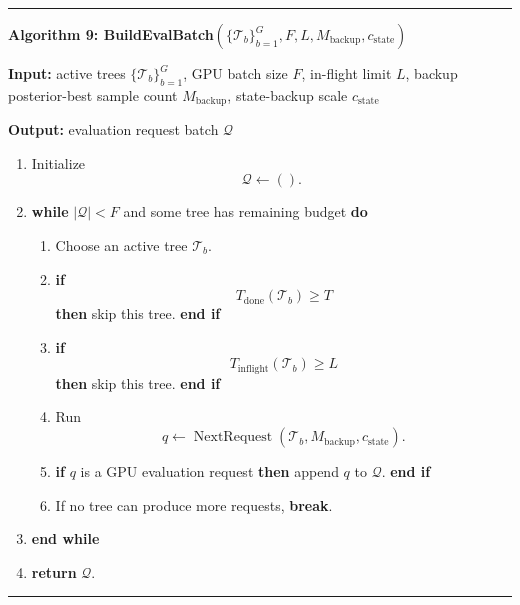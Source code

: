 \documentclass[11pt]{article}
\newcommand{\Tree}{\mathcal{T}}
\newcommand{\NextRequest}{\operatorname{NextRequest}}
\newenvironment{algorithmblock}[1]
{
  \par\medskip
  \noindent\hrule\par\smallskip
  \noindent\textbf{#1}
  \par\smallskip
}
{
  \par\smallskip\noindent\hrule\par\medskip
}
\newcommand{\Input}{\textbf{Input: }}
\newcommand{\Output}{\textbf{Output: }}
\newcommand{\Return}{\textbf{return }}
\newcommand{\If}{\textbf{if }}
\newcommand{\Then}{\textbf{ then }}
\newcommand{\EndIf}{\textbf{end if}}
\newcommand{\While}{\textbf{while }}
\newcommand{\EndWhile}{\textbf{end while}}
\newcommand{\Do}{\textbf{ do }}
\newcommand{\Break}{\textbf{break}}
\begin{document}
\begin{algorithmblock}{Algorithm 9: BuildEvalBatch\((\{\Tree_b\}_{b=1}^{G},F,L,M_{\mathrm{backup}},c_{\mathrm{state}})\)}

\Input active trees \(\{\Tree_b\}_{b=1}^{G}\), GPU batch size \(F\), in-flight limit \(L\), backup posterior-best sample count \(M_{\mathrm{backup}}\), state-backup scale \(c_{\mathrm{state}}\)

\Output evaluation request batch \(\mathcal{Q}\)

\begin{enumerate}[leftmargin=2em]
  \item Initialize
  \[
  \mathcal{Q} \gets ().
  \]

  \item \While \(|\mathcal{Q}| < F\) and some tree has remaining budget \Do

  \begin{enumerate}[leftmargin=2em]
    \item Choose an active tree \(\Tree_b\).

    \item \If
    \[
    T_{\mathrm{done}}(\Tree_b) \ge T
    \]
    \Then skip this tree. \EndIf

    \item \If
    \[
    T_{\mathrm{inflight}}(\Tree_b) \ge L
    \]
    \Then skip this tree. \EndIf

    \item Run
    \[
    q
    \gets
    \NextRequest(\Tree_b,M_{\mathrm{backup}},c_{\mathrm{state}}).
    \]

    \item \If \(q\) is a GPU evaluation request \Then append \(q\) to \(\mathcal{Q}\). \EndIf

    \item If no tree can produce more requests, \Break.

  \end{enumerate}

  \item \EndWhile

  \item \Return \(\mathcal{Q}\).
\end{enumerate}

\end{algorithmblock}
\end{document}

